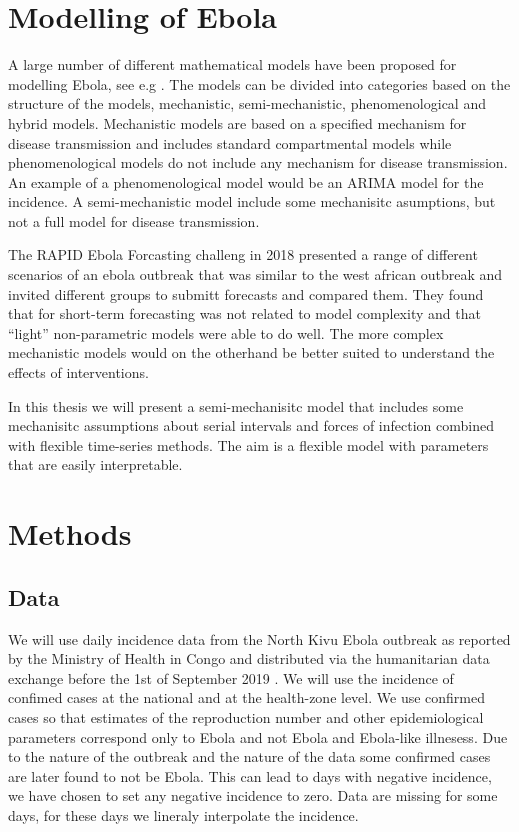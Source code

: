 \documentclass[12pt]{article}
\begin{document}
\section{Modelling of Ebola}

A large number of different mathematical models have been proposed for modelling Ebola, see e.g \cite{chretienMathematicalModelingWest,viboudRAPIDDEbolaForecasting2018}. The models can be divided into categories based on the structure of the models, mechanistic, semi-mechanistic, phenomenological and hybrid models. Mechanistic models are based on a specified mechanism for disease transmission and includes standard compartmental models while phenomenological models do not include any mechanism for disease transmission. An example of a phenomenological model would be an ARIMA model for the incidence. A semi-mechanistic model include some mechanisitc asumptions, but not a full model for disease transmission.

The RAPID Ebola Forcasting challeng in 2018 \cite{viboudRAPIDDEbolaForecasting2018} presented a range of different scenarios of an ebola outbreak that was similar to the west african outbreak and invited different groups to submitt forecasts and compared them. They found that for short-term forecasting was not related to model complexity and that ``light'' non-parametric models were able to do well. The more complex mechanistic models would on the otherhand be better suited to understand the effects of interventions. 

In this thesis we will present a semi-mechanisitc model that includes some mechanisitc assumptions about serial intervals and forces of infection combined with flexible time-series methods. The aim is a flexible model with parameters that are easily interpretable. 

\section{Methods}

\subsection{Data}
We will use daily incidence data from the North Kivu Ebola outbreak as reported by the Ministry of Health in Congo and distributed via the humanitarian data exchange before the 1st of September 2019 \cite{EbolaCasesDeaths}. We will use the incidence of confimed cases at the national and at the health-zone level. We use confirmed cases so that estimates of the reproduction number and other epidemiological parameters correspond only to Ebola and not Ebola and Ebola-like illnesess. Due to the nature of the outbreak and the nature of the data some confirmed cases are later found to not be Ebola. This can lead to days with negative incidence, we have chosen to set any negative incidence to zero. Data are missing for some days, for these days we lineraly interpolate the incidence. 
\end{document}
